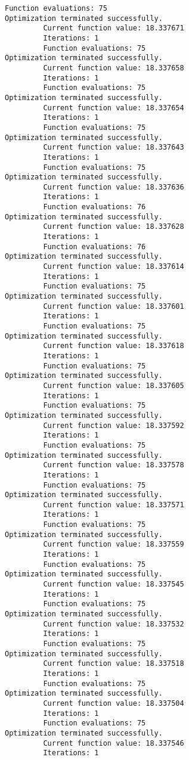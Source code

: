 \documentclass[11pt]{article}
\begin{document}
\begin{Verbatim}[commandchars=\\\{\}]
         Function evaluations: 75
Optimization terminated successfully.
         Current function value: 18.337671
         Iterations: 1
         Function evaluations: 75
Optimization terminated successfully.
         Current function value: 18.337658
         Iterations: 1
         Function evaluations: 75
Optimization terminated successfully.
         Current function value: 18.337654
         Iterations: 1
         Function evaluations: 75
Optimization terminated successfully.
         Current function value: 18.337643
         Iterations: 1
         Function evaluations: 75
Optimization terminated successfully.
         Current function value: 18.337636
         Iterations: 1
         Function evaluations: 76
Optimization terminated successfully.
         Current function value: 18.337628
         Iterations: 1
         Function evaluations: 76
Optimization terminated successfully.
         Current function value: 18.337614
         Iterations: 1
         Function evaluations: 75
Optimization terminated successfully.
         Current function value: 18.337601
         Iterations: 1
         Function evaluations: 75
Optimization terminated successfully.
         Current function value: 18.337618
         Iterations: 1
         Function evaluations: 75
Optimization terminated successfully.
         Current function value: 18.337605
         Iterations: 1
         Function evaluations: 75
Optimization terminated successfully.
         Current function value: 18.337592
         Iterations: 1
         Function evaluations: 75
Optimization terminated successfully.
         Current function value: 18.337578
         Iterations: 1
         Function evaluations: 75
Optimization terminated successfully.
         Current function value: 18.337571
         Iterations: 1
         Function evaluations: 75
Optimization terminated successfully.
         Current function value: 18.337559
         Iterations: 1
         Function evaluations: 75
Optimization terminated successfully.
         Current function value: 18.337545
         Iterations: 1
         Function evaluations: 75
Optimization terminated successfully.
         Current function value: 18.337532
         Iterations: 1
         Function evaluations: 75
Optimization terminated successfully.
         Current function value: 18.337518
         Iterations: 1
         Function evaluations: 75
Optimization terminated successfully.
         Current function value: 18.337504
         Iterations: 1
         Function evaluations: 75
Optimization terminated successfully.
         Current function value: 18.337546
         Iterations: 1

\end{Verbatim}
\end{document}
